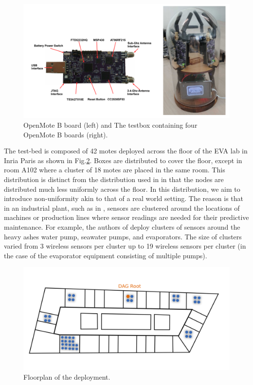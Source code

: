 \documentclass[journal]{IEEEtran}
\begin{document}
\begin{figure}
	\centering
	\includegraphics[width=0.90\columnwidth]{mote_ot}
	\caption{OpenMote B board (left) and The testbox containing four OpenMote B boards (right).}
    \label{fig:testbox}
\end{figure}


The test-bed is composed of 42 motes deployed across the floor of the EVA lab in Inria Paris as shown in Fig.\ref{fig:floorplan}.
Boxes are distributed to cover the floor, except in room A102 where a cluster of 18 motes are placed in the same room.
This distribution is distinct from the distribution used in \cite{brachmann19ieee} in that the nodes are distributed much less uniformly across the floor. 
In this distribution, we aim to introduce non-uniformity akin to that of a real world setting.
The reason is that in an industrial plant, such as in \cite{civerchia17industrial}, sensors are clustered around the locations of machines or production lines where sensor readings are needed for their predictive maintenance.
For example, the authors of \cite{civerchia17industrial} deploy clusters of sensors around the heavy ashes water pump, seawater pumps, and evaporators. 
The size of clusters varied from 3 wireless sensors per cluster up to 19 wireless sensors per cluster (in the case of the evaporator equipment consisting of multiple pumps). 



\begin{figure}
	\centering
	\includegraphics[width=0.90\columnwidth]{building_motes}
	\caption{Floorplan of the deployment.}
    \label{fig:floorplan}
\end{figure}
\end{document}
